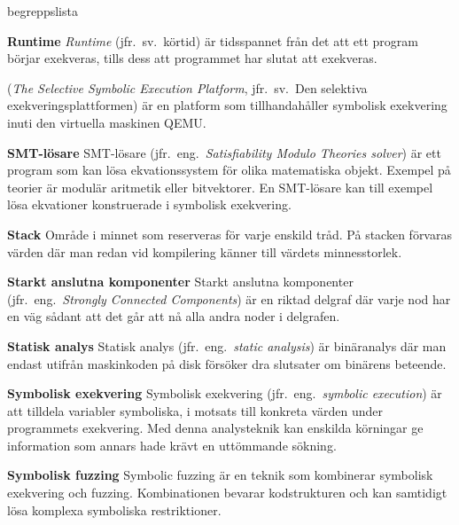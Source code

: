 \begin{labeling}{begreppslista}
    \item [\textbf{Runtime}] \emph{Runtime} (jfr.\ sv.\ körtid) är tidsspannet
    från det att ett program börjar exekveras, tills dess att programmet har
    slutat att exekveras.

    \item [\textbf{\stoe}] \stoe (\emph{The Selective Symbolic Execution
        Platform}, jfr.\ sv.\ Den selektiva exekveringsplattformen) är
    en platform som tillhandahåller symbolisk exekvering inuti den virtuella
    maskinen QEMU.\@

    \item [\textbf{SMT-lösare}] SMT-lösare (jfr.\ eng.\ \emph{Satisfiability Modulo
        Theories solver}) är ett program som kan lösa
    ekvationssystem för olika matematiska objekt. Exempel på
    teorier är modulär aritmetik eller bitvektorer. En SMT-lösare
    kan till exempel lösa ekvationer konstruerade i symbolisk
    exekvering.

    \item [\textbf{Stack}] Område i minnet som reserveras för varje
    enskild tråd. På stacken förvaras värden där man redan vid
    kompilering känner till värdets minnesstorlek.

    \item [\textbf{Starkt anslutna komponenter}] Starkt anslutna komponenter
    (jfr.\ eng.\ \emph{Strongly Connected Components}) är en riktad delgraf där
    varje nod har en väg sådant att det går att nå alla andra noder i delgrafen.

    \item [\textbf{Statisk analys}] Statisk analys (jfr.\ eng.\ \emph{static
        analysis}) är binäranalys där man endast utifrån maskinkoden på disk
    försöker dra slutsater om binärens beteende.


    \item [\textbf{Symbolisk exekvering}] Symbolisk exekvering (jfr.\ eng.\
    \emph{symbolic execution}) är att tilldela variabler symboliska, i motsats
    till konkreta värden under programmets exekvering. Med denna analysteknik
    kan enskilda körningar ge information som annars hade krävt en uttömmande
    sökning.

    \item [\textbf{Symbolisk fuzzing}] Symbolic fuzzing är en teknik som kombinerar symbolisk
    exekvering och fuzzing. Kombinationen bevarar kodstrukturen och kan
    samtidigt lösa komplexa symboliska restriktioner.


\end{labeling}

